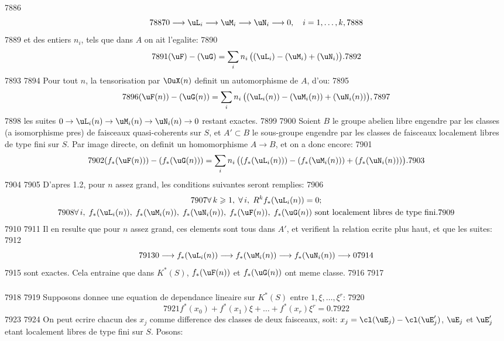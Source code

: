   7886	\[
  7887	0 \longrightarrow \uL_i \longrightarrow \uM_i \longrightarrow \uN_i \longrightarrow 0, \quad i = 1, \ldots, k,
  7888	\]
  7889	et des entiers $n_i$, tels que dans $A$ on ait l'egalite:
  7890	\[
  7891	(\uF) - (\uG) = \sum_i n_i\,\bigl((\uL_i) - (\uM_i) + (\uN_i)\bigr).
  7892	\]
  7893	
  7894	Pour tout $n$, la tensorisation par $\OuX(n)$ definit un automorphisme de $A$, d'ou:
  7895	\[
  7896	(\uF(n)) - (\uG(n)) = \sum_i n_i\,\bigl((\uL_i(n)) - (\uM_i(n)) + (\uN_i(n))\bigr),
  7897	\]
  7898	les suites $0 \to \uL_i(n) \to \uM_i(n) \to \uN_i(n) \to 0$ restant exactes.
  7899	
  7900	Soient $B$ le groupe abelien libre engendre par les classes (a isomorphisme pres) de faisceaux quasi-coherents sur $S$, et $A' \subset B$ le sous-groupe engendre par les classes de faisceaux localement libres de type fini sur $S$. Par image directe, on definit un homomorphisme $A \longrightarrow B$, et on a donc encore:
  7901	\[
  7902	(f_*(\uF(n))) - (f_*(\uG(n))) = \sum_i n_i\,\bigl((f_*(\uL_i(n))) - (f_*(\uM_i(n))) + (f_*(\uN_i(n)))\bigr).
  7903	\]
  7904	
  7905	D'apres 1.2, pour $n$ assez grand, les conditions suivantes seront remplies:
  7906	\begin{gather*}
  7907	\forall\, k \geqslant 1,\; \forall\, i,\; R^k f_*(\uL_i(n)) = 0;\\
  7908	\forall\, i,\; f_*(\uL_i(n)),\; f_*(\uM_i(n)),\; f_*(\uN_i(n)),\; f_*(\uF(n)),\; f_*(\uG(n)) \text{ sont localement libres de type fini.}
  7909	\end{gather*}
  7910	
  7911	Il en resulte que pour $n$ assez grand, ces elements sont tous dans $A'$, et verifient la relation ecrite plus haut, et que les suites:
  7912	\[
  7913	0 \longrightarrow f_*(\uL_i(n)) \longrightarrow f_*(\uM_i(n)) \longrightarrow f_*(\uN_i(n)) \longrightarrow 0
  7914	\]
  7915	sont exactes. Cela entraine que dans $K^*(S)$, $f_*(\uF(n))$ et $f_*(\uG(n))$ ont meme classe.
  7916	
  7917	\subsubsection{}
  7918	
  7919	Supposons donnee une equation de dependance lineaire sur $K^*(S)$ entre $1, \xi, \ldots, \xi^r$:
  7920	\begin{equation}\label{eq:1.11.1}
  7921	f^*(x_0) + f^*(x_1)\xi + \ldots + f^*(x_r)\xi^r = 0.
  7922	\end{equation}
  7923	
  7924	On peut ecrire chacun des $x_j$ comme difference des classes de deux faisceaux, soit: $x_j = \cl(\uE_j) - \cl(\uE'_j)$, $\uE_j$ et $\uE'_j$ etant localement libres de type fini sur $S$. Posons:
